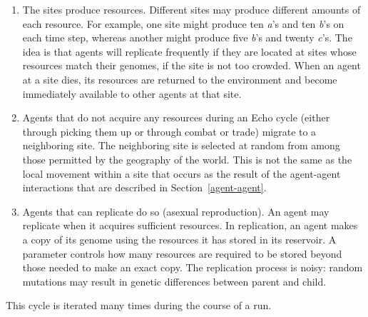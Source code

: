 \begin{enumerate}
\item The sites produce resources. Different sites may produce
  different amounts of each resource.  For example, one site might
  produce ten {\em a}'s and ten {\em b}'s on each time step, whereas
  another might produce five {\em b}'s and twenty {\em c}'s.  The
  idea is that agents will replicate frequently if they are located
  at sites whose resources match their genomes, if the site is not too
  crowded.  When an agent at a site dies, its resources are returned
  to the environment and become immediately available to other agents
  at that site.

\item Agents that do not acquire any resources during an Echo cycle
  (either through picking them up or through combat or trade) migrate
  to a neighboring site. The neighboring site is selected at random
  from among those permitted by the geography of the world.  This is
  not the same as the local movement within a site that occurs as the
  result of the agent-agent interactions that are described in
  Section~\ref{agent-agent}.

\item Agents that can replicate do so (asexual reproduction).  An
  agent may replicate when it acquires sufficient resources.  In
  replication, an agent makes a copy of its genome using the resources
  it has stored in its reservoir.  A parameter controls how many
  resources are required to be stored beyond those needed to make an
  exact copy.  The replication process is noisy: random mutations may
  result in genetic differences between parent and child.

\end{enumerate}
This cycle is iterated many times during the course of a run.


